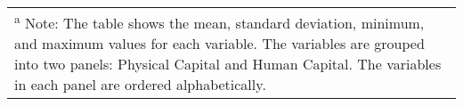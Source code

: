 \begin{table}
\begin{tabular}[t]{rrrrrrrrrrrrrrrrrrrrrrrrrrrrrrrrrrrrrrrrrrrr}
\bottomrule
\multicolumn{44}{l}{\textsuperscript{a} Note: The table shows the mean, standard deviation, minimum, and maximum values for each variable. The variables are grouped into two panels: Physical Capital and Human Capital. The variables in each panel are ordered alphabetically.}\\
\end{tabular}
\end{table}
